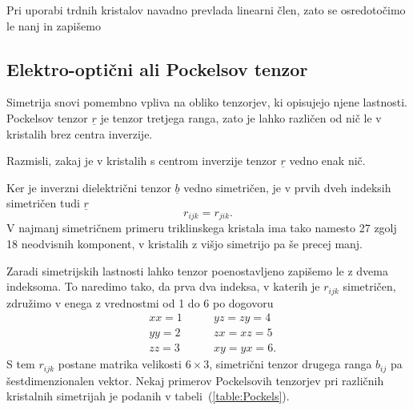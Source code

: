 Pri uporabi trdnih kristalov navadno prevlada linearni člen, zato se osredotočimo
le nanj in zapišemo

\subsection*{Elektro-optični ali Pockelsov tenzor}
Simetrija snovi pomembno vpliva na obliko tenzorjev, ki opisujejo njene lastnosti.
Pockelsov tenzor $\underline{r}$ je tenzor tretjega ranga, zato je lahko različen
od nič le v kristalih brez centra inverzije. 
\begin{definition}
Razmisli, zakaj je v kristalih s centrom inverzije tenzor $\underline{r}$
vedno enak nič. 
\end{definition}

Ker je inverzni dielektrični tenzor $\underline{b}$ vedno simetričen, je v 
prvih dveh indeksih simetričen tudi $\underline{r}$
\begin{equation}
r_{ijk} = r_{jik}.
\end{equation}
V najmanj simetričnem primeru triklinskega kristala ima tako namesto 27 zgolj 
18 neodvisnih komponent, v kristalih z višjo simetrijo pa še precej manj. 

Zaradi simetrijskih lastnosti lahko tenzor poenostavljeno zapišemo le z dvema
indeksoma. To naredimo tako, da prva dva indeksa, v katerih je $r_{ijk}$ simetričen, združimo
v enega z vrednostmi od 1 do 6 po dogovoru 
\begin{eqnarray}
 &xx=1 \qquad  &yz=zy = 4 \\
 &yy=2 \qquad  &zx=xz = 5 \\
 &zz=3 \qquad  &xy=yx = 6.
\end{eqnarray}
S tem $r_{ijk}$ postane matrika velikosti $6\times3$, simetrični tenzor drugega 
ranga $b_{ij}$ pa šestdimenzionalen vektor.
Nekaj primerov Pockelsovih tenzorjev pri različnih kristalnih simetrijah
je podanih v tabeli~(\ref{table:Pockels}).

